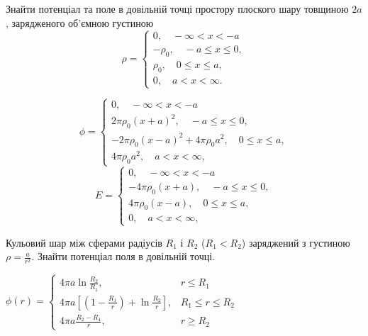 \begin{problem}
    Знайти потенціал та поле в довільній точці простору плоского шару товщиною $2a$, зарядженого об'ємною густиною~
	\[
		\rho = \begin{cases}
				0, \quad -\infty< x < -a \\
				-\rho_0, \quad -a \le x \le 0, \\
				\rho_0, \quad 0 \le x \le a, \\
				0, \quad a < x < \infty.
				\end{cases}
	\]
	\begin{solution}
		\[
		\phi = \begin{cases}
				0, \quad -\infty< x < -a \\
				2\pi\rho_0 (x+a)^2, \quad -a \le x \le 0, \\
				-2\pi\rho_0 (x-a)^2 + 4\pi\rho_0a^2, \quad 0 \le x \le a, \\
				4\pi\rho_0a^2, \quad a < x < \infty,
				\end{cases}
		\]
		\[
		E = \begin{cases}
				0, \quad -\infty< x < -a \\
				-4\pi\rho_0 (x+a), \quad -a \le x \le 0, \\
				4\pi\rho_0 (x-a), \quad 0 \le x \le a, \\
				0, \quad a < x < \infty,
				\end{cases}
		\]
	\end{solution}
\end{problem}


\begin{problem}
Кульовий шар між сферами радіусів $R_1$ і $R_2$ ($R_1 < R_2$) заряджений з густиною $\rho = \frac{a}{r^2}$. Знайти потенціал поля в довільній точці.
\begin{solution}
	$
		\phi(r) =
		\begin{cases}
			4\pi a\ln\frac{R_2}{R_1},                                                  & r \le R_1         \\
			4\pi a \left[ \left( 1- \frac{R_1}{r}\right)  + \ln\frac{R_2}{r} \right] , & R_1 \le r \le R_2 \\
			4\pi a \frac{R_2 - R_1}{r},                                                & r \ge R_2
		\end{cases}
	$
\end{solution}
\end{problem}

